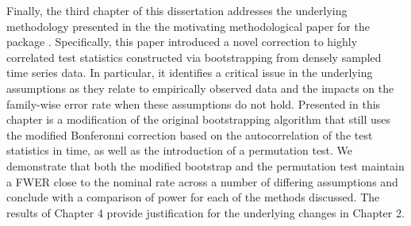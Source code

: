 Finally, the third chapter of this dissertation addresses the underlying methodology presented in the the motivating methodological paper for the  package \citep{oleson2017detecting}. Specifically, this paper introduced a novel correction to highly correlated test statistics constructed via bootstrapping from densely sampled time series data. In particular, it identifies a critical issue in the underlying assumptions as they relate to empirically observed data and the impacts on the family-wise error rate when these assumptions do not hold. Presented in this chapter is a modification of the original bootstrapping algorithm that still uses the modified Bonferonni correction based on the autocorrelation of the test statistics in time, as well as the introduction of a permutation test. We demonstrate that both the modified bootstrap and the permutation test maintain a FWER close to the nominal rate across a number of differing assumptions and conclude with a comparison of power for each of the methods discussed. The results of Chapter 4 provide justification for the underlying changes in Chapter 2. 


